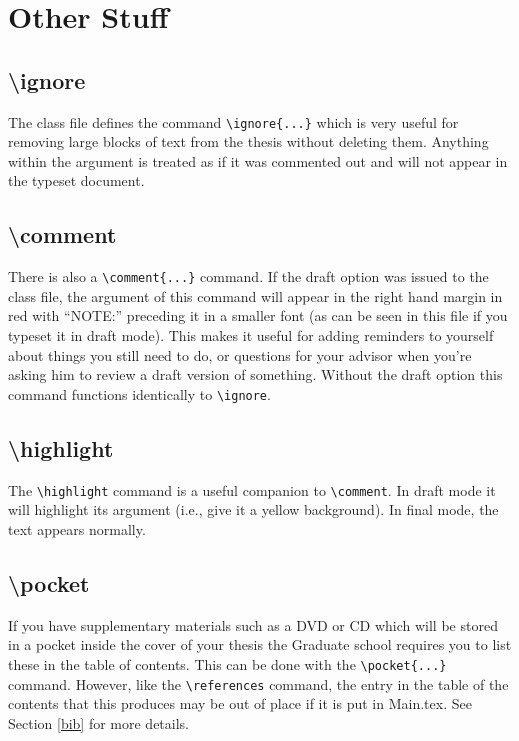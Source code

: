 \chapter{Other Stuff}
\section{\textbackslash ignore}
The class file defines the command \verb=\ignore{...}= which is very useful for removing large blocks of text from the thesis without deleting them.  Anything within the argument is treated as if it was commented out and will not appear in the typeset document.

\section{\textbackslash comment}
There is also a \verb=\comment{...}= command.  If the draft option was issued to the class file, the argument of this command will appear in the right hand margin in red with ``NOTE:'' preceding it in a smaller font (as can be seen in this file if you typeset it in draft mode).  This makes it useful for adding reminders to yourself about things you still need to do, or questions for your advisor when you're asking him to review a draft version of something.  Without the draft option this command functions identically to \verb=\ignore=.

\section{\textbackslash highlight}
The \verb=\highlight= command is a useful companion to \verb=\comment=.  In draft mode it will highlight its argument (i.e., give it a yellow background).  In final mode, the text appears normally.

\section{\textbackslash pocket}
If you have supplementary materials such as a DVD or CD which will be stored in a pocket inside the cover of your thesis the Graduate school requires you to list these in the table of contents.  This can be done with the \verb=\pocket{...}= command.  However, like the \verb=\references= command, the entry in the table of the contents that this produces may be out of place if it is put in Main.tex.  See Section \ref{bib} for more details.

